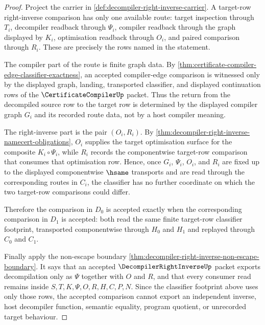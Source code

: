 \begin{proof}
Project the carrier in \autoref{def:decompiler-right-inverse-carrier}. A target-row right-inverse comparison has only one available route: target inspection through $T_i$, decompiler readback through $\Psi_i$, compiler readback through the graph displayed by $K_i$, optimisation readback through $O_i$, and paired comparison through $R_i$. These are precisely the rows named in the statement.

The compiler part of the route is finite graph data. By \autoref{thm:certificate-compiler-edge-classifier-exactness}, an accepted compiler-edge comparison is witnessed only by the displayed graph, landing, transported classifier, and displayed continuation rows of the $\CertificateCompilerUp$ packet. Thus the return from the decompiled source row to the target row is determined by the displayed compiler graph $G_i$ and its recorded route data, not by a host compiler meaning.

The right-inverse part is the pair $(O_i,R_i)$. By \autoref{thm:decompiler-right-inverse-namecert-obligations}, $O_i$ supplies the target optimisation surface for the composite $K_i\circ\Psi_i$, while $R_i$ records the componentwise target-row comparison that consumes that optimisation row. Hence, once $G_i$, $\Psi_i$, $O_i$, and $R_i$ are fixed up to the displayed componentwise $\hsame$ transports and are read through the corresponding routes in $C_i$, the classifier has no further coordinate on which the two target-row comparisons could differ.

Therefore the comparison in $D_0$ is accepted exactly when the corresponding comparison in $D_1$ is accepted: both read the same finite target-row classifier footprint, transported componentwise through $H_0$ and $H_1$ and replayed through $C_0$ and $C_1$.

Finally apply the non-escape boundary \autoref{thm:decompiler-right-inverse-non-escape-boundary}. It says that an accepted $\DecompilerRightInverseUp$ packet exports decompilation only as $\Psi$ together with $O$ and $R$, and that every consumer read remains inside $S,T,K,\Psi,O,R,H,C,P,N$. Since the classifier footprint above uses only those rows, the accepted comparison cannot export an independent inverse, host decompiler function, semantic equality, program quotient, or unrecorded target behaviour.
\end{proof}
